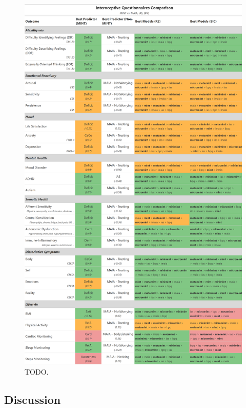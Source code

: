 \documentclass[
  jou,
  floatsintext,
  longtable,
  nolmodern,
  notxfonts,
  notimes,
  colorlinks=true,linkcolor=blue,citecolor=blue,urlcolor=blue]{apa7}
\begin{document}
\begin{figure}[!htbp]

{\caption{{TODO.}{\label{fig-six}}}}

\begin{center}
\includegraphics[width=1\linewidth,height=\textheight,keepaspectratio]{../study2/analysis/figures/table2.png}
\end{center}

\end{figure}

\subsection{Discussion}\label{discussion-1}
\end{document}
